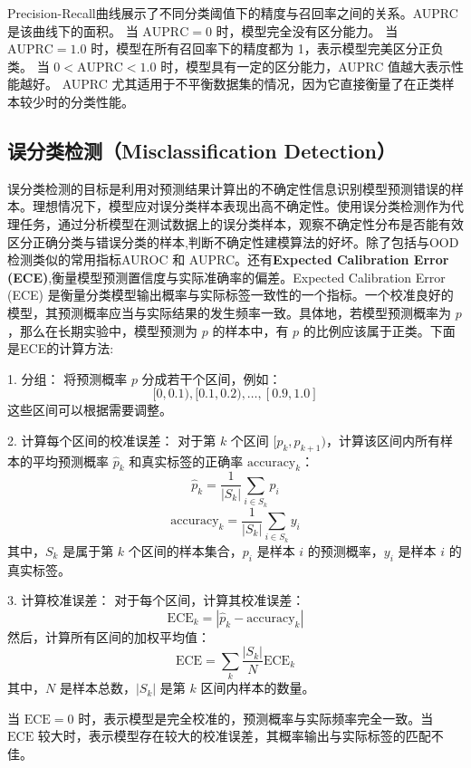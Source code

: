 Precision-Recall曲线展示了不同分类阈值下的精度与召回率之间的关系。AUPRC 是该曲线下的面积。
当 \(\text{AUPRC} = 0\) 时，模型完全没有区分能力。
当 \(\text{AUPRC} = 1.0\) 时，模型在所有召回率下的精度都为 1，表示模型完美区分正负类。
当 \(0 < \text{AUPRC} < 1.0\) 时，模型具有一定的区分能力，AUPRC 值越大表示性能越好。
AUPRC 尤其适用于不平衡数据集的情况，因为它直接衡量了在正类样本较少时的分类性能。




\subsection{误分类检测（Misclassification Detection）}


误分类检测的目标是利用对预测结果计算出的不确定性信息识别模型预测错误的样本。理想情况下，模型应对误分类样本表现出高不确定性。使用误分类检测作为代理任务，通过分析模型在测试数据上的误分类样本，观察不确定性分布是否能有效区分正确分类与错误分类的样本,判断不确定性建模算法的好坏。除了包括与OOD 检测类似的常用指标AUROC 和 AUPRC。还有\textbf{Expected Calibration Error (ECE)},衡量模型预测置信度与实际准确率的偏差。Expected Calibration Error (ECE) 是衡量分类模型输出概率与实际标签一致性的一个指标。一个校准良好的模型，其预测概率应当与实际结果的发生频率一致。具体地，若模型预测概率为 \( p \)，那么在长期实验中，模型预测为 \( p \) 的样本中，有 \( p \) 的比例应该属于正类。下面是ECE的计算方法:


1. 分组：
   将预测概率 \( p \) 分成若干个区间，例如：
   \[
   [0, 0.1), [0.1, 0.2), \dots, [0.9, 1.0]
   \]
   这些区间可以根据需要调整。

2. 计算每个区间的校准误差：
   对于第 \( k \) 个区间 \( [p_k, p_{k+1}) \)，计算该区间内所有样本的平均预测概率 \( \hat{p}_k \) 和真实标签的正确率 \( \text{accuracy}_k \)：
   \[
   \hat{p}_k = \frac{1}{|S_k|} \sum_{i \in S_k} p_i
   \]
   \[
   \text{accuracy}_k = \frac{1}{|S_k|} \sum_{i \in S_k} y_i
   \]
   其中，\( S_k \) 是属于第 \( k \) 个区间的样本集合，\( p_i \) 是样本 \( i \) 的预测概率，\( y_i \) 是样本 \( i \) 的真实标签。

3. 计算校准误差：
   对于每个区间，计算其校准误差：
   \[
   \text{ECE}_k = | \hat{p}_k - \text{accuracy}_k |
   \]
   然后，计算所有区间的加权平均值：
   \[
   \text{ECE} = \sum_k \frac{|S_k|}{N} \text{ECE}_k
   \]
   其中，\( N \) 是样本总数，\( |S_k| \) 是第 \( k \) 区间内样本的数量。


当 \(\text{ECE} = 0\) 时，表示模型是完全校准的，预测概率与实际频率完全一致。当 \(\text{ECE}\) 较大时，表示模型存在较大的校准误差，其概率输出与实际标签的匹配不佳。





